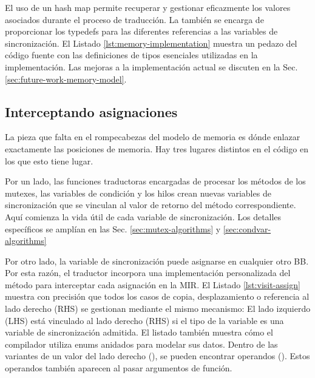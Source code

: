 El uso de un hash map permite recuperar y gestionar eficazmente los valores asociados
durante el proceso de traducción. La  también se encarga de proporcionar los typedefs
para las diferentes referencias a las variables de sincronización.
El Listado \ref{lst:memory-implementation} muestra un
pedazo del código fuente con las definiciones de tipos esenciales utilizadas en la
implementación. Las mejoras a la implementación actual se discuten en la Sec. \ref{sec:future-work-memory-model}.

\subsection{Interceptando asignaciones}
\label{sec:intercepting-assignments}

La pieza que falta en el rompecabezas del modelo de memoria es dónde enlazar exactamente las
posiciones de memoria. Hay tres lugares distintos en el código en los que esto tiene lugar.

Por un lado, las funciones traductoras encargadas de procesar los métodos de los mutexes, las
variables de condición y los hilos crean nuevas variables de sincronización que se vinculan al
valor de retorno del método correspondiente. Aquí comienza la vida útil de cada variable de
sincronización. Los detalles específicos se amplían en las Sec. \ref{sec:mutex-algorithms} y \ref{sec:condvar-algorithms}

Por otro lado, la variable de sincronización puede asignarse en cualquier otro \acrshort{BB}. Por esta
razón, el traductor incorpora una implementación personalizada del método 
para interceptar cada asignación en la \acrshort{MIR}.
El Listado \ref{lst:visit-assign} muestra con precisión que todos
los casos de copia, desplazamiento o referencia al lado derecho (\acrfull{RHS}) se gestionan
mediante el mismo mecanismo:
El lado izquierdo (\acrfull{LHS}) está vinculado al lado derecho (\acrfull{RHS}) si el tipo de la variable es una
variable de sincronización admitida. El listado también muestra cómo el compilador utiliza
enums anidados para modelar sus datos. Dentro de las variantes de un valor del lado derecho
(), se pueden encontrar operandos ().
Estos operandos también aparecen al pasar argumentos de función.

